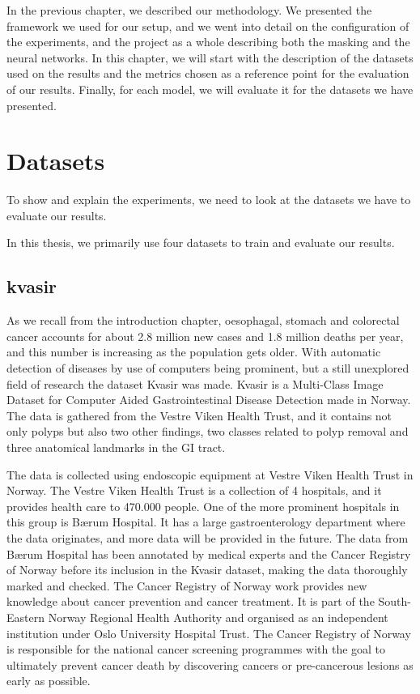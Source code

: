 In the previous chapter, we described our methodology. We presented the framework we used for our setup, and we went into detail on the configuration of the experiments, and the project as a whole describing both the masking and the neural networks. 
In this chapter, we will start with the description of the datasets used on the results and the metrics chosen as a reference point for the evaluation of our results. 
Finally, for each model, we will evaluate it for the datasets we have presented.

\section{Datasets}
To show and explain the experiments, we need to look at the datasets we have to evaluate our results. 

In this thesis, we primarily use four datasets to train and evaluate our results.



\subsection{kvasir}



As we recall from the introduction chapter, oesophagal, stomach and colorectal cancer accounts for about 2.8 million new cases and 1.8 million deaths per year, and this number is increasing as the population gets older.   With automatic detection of diseases by use of computers being prominent, but a still unexplored field of research the dataset Kvasir was made.
Kvasir is a Multi-Class Image Dataset for Computer Aided Gastrointestinal Disease Detection made in Norway. The data is gathered from the Vestre Viken Health Trust, and it contains not only polyps but also two other findings, two classes related to polyp removal and three anatomical landmarks in the GI tract.

The data is collected using endoscopic equipment at Vestre Viken Health Trust in Norway. The Vestre Viken Health Trust is a collection of 4 hospitals, and it provides health care to 470.000 people.
One of the more prominent hospitals in this group is Bærum Hospital. It has a large gastroenterology department where the data originates, and more data will be provided in the future. The data from Bærum Hospital has been annotated by medical experts and the Cancer Registry of Norway before its inclusion in the Kvasir dataset, making the data thoroughly marked and checked.
The Cancer Registry of Norway work provides new knowledge about cancer prevention and cancer treatment. It is part of the South-Eastern Norway Regional Health Authority and organised as an independent institution under Oslo University Hospital Trust. The Cancer Registry of Norway is responsible for the national cancer screening programmes with the goal to ultimately prevent cancer death by discovering cancers or pre-cancerous lesions as early as possible. 


